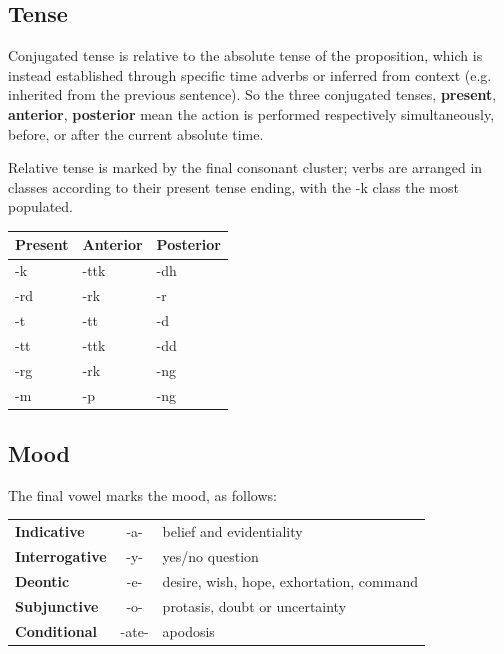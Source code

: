 \documentclass[10pt,oneside]{memoir}
\newcommand\setrow[1]{\gdef\rowmac{#1}#1\ignorespaces}
\newcommand\clearrow{\global\let\rowmac\relax}
\begin{document}
\begin{multicols}{2}
	\subsection{Tense}
	Conjugated tense is relative to the absolute tense of the proposition, which is instead established through specific time adverbs or inferred from context (e.g. inherited from the previous sentence). So the three conjugated tenses, \textbf{present}, \textbf{anterior}, \textbf{posterior} mean the action is performed respectively simultaneously, before, or after the current absolute time.

	Relative tense is marked by the final consonant cluster; verbs are arranged in classes according to their present tense ending, with the -k class the most populated.

	\vspace{10pt}

	\begin{tabularx}{\columnwidth}{>{\rowmac}Y>{\rowmac}Y>{\rowmac}Y<{\clearrow}}
		\setrow{\bfseries}Present & Anterior &Posterior \\
		\hline
		-k & -ttk & -dh \\
		-rd & -rk & -r \\
		-t & -tt & -d \\
		-tt & -ttk & -dd \\
		-rg & -rk & -ng \\
		-m & -p & -ng
	\end{tabularx}

	\subsection{Mood}

	The final vowel marks the mood, as follows:

	\begin{tabularx}{\columnwidth}{l | c | >{\small}X<{\normalsize}}
		\textbf{Indicative} & -a- & belief and evidentiality\\
		\textbf{Interrogative} & -y- & yes/no question\\
		\textbf{Deontic} & -e- & desire, wish, hope, exhortation, command\\
		\textbf{Subjunctive} & -o- & protasis, doubt or uncertainty\\
		\textbf{Conditional} & -ate- & apodosis\\
	\end{tabularx}


\end{multicols}
\end{document}
